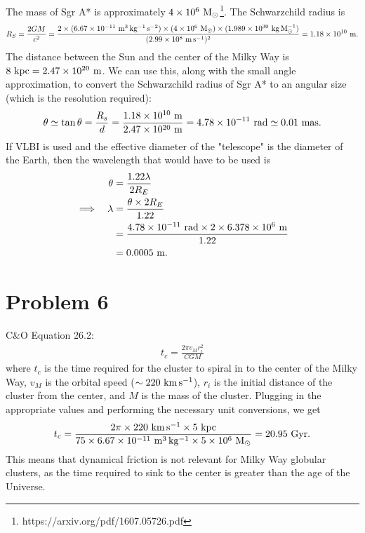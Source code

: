 \documentclass[11pt,letterpaper]{article}
\begin{document}
The mass of Sgr A* is approximately $4\times 10^{6}~{\rm M_\odot}$\footnote{https://arxiv.org/pdf/1607.05726.pdf}. The Schwarzchild radius is
\begin{align*}
    R_S = \frac{2GM}{c^2} = \frac{2\times (6.67\times 10^{-11}~{\rm m^3\,kg^{-1}\,s^{-2}})\times (4\times 10^{6}~{\rm M_\odot})\times (1.989\times 10^{30}~{\rm kg\,M_\odot^{-1}})}{(2.99\times 10^{8}~{\rm m\,s^{-1}})^2} = 1.18\times 10^{10}~{\rm m}.
\end{align*}
The distance between the Sun and the center of the Milky Way is $8~{\rm kpc} = 2.47\times 10^{20}~{\rm m}$. We can use this, along with the small angle approximation, to convert the Schwarzchild radius of Sgr A* to an angular size (which is the resolution required):
\begin{align*}
    \theta \simeq \tan{\theta} = \frac{R_s}{d} = \frac{1.18\times 10^{10}~{\rm m}}{2.47\times 10^{20}~{\rm m}} = 4.78\times 10^{-11}~{\rm rad} \simeq 0.01~{\rm mas}. 
\end{align*}
If VLBI is used and the effective diameter of the "telescope" is the diameter of the Earth, then the wavelength that would have to be used is 
\begin{alignat*}{2}
    &&\theta &= \frac{1.22\lambda}{2R_E} \\
    \implies&&\lambda &= \frac{\theta \times 2R_E}{1.22} \\
    &&&= \frac{4.78\times 10^{-11}~{\rm rad}\times 2\times 6.378\times 10^{6}~{\rm m}}{1.22} \\
    &&&= 0.0005~{\rm m}.
\end{alignat*}


\section*{Problem 6}

C&O Equation 26.2:
\begin{align*}
    t_c = \frac{2\pi v_M r_i^2}{CGM}
\end{align*}
where $t_c$ is the time required for the cluster to spiral in to the center of the Milky Way, $v_M$ is the orbital speed ($\sim 220~{\rm km\,s^{-1}}$), $r_i$ is the initial distance of the cluster from the center, and $M$ is the mass of the cluster. Plugging in the appropriate values and performing the necessary unit conversions, we get 
\begin{align*}
    t_c = \frac{2\pi \times 220~{\rm km\,s^{-1}}\times 5~{\rm kpc}}{75\times 6.67\times 10^{-11}~{\rm m^3\,kg^{-1}}\times 5\times 10^{6}~{\rm M_\odot}} = 20.95~{\rm Gyr}.
\end{align*}
This means that dynamical friction is not relevant for Milky Way globular clusters, as the time required to sink to the center is greater than the age of the Universe. 
\end{document}

